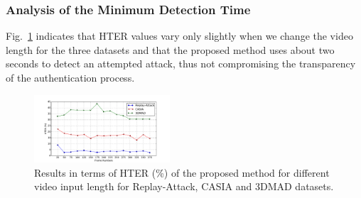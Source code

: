 
\subsubsection{Analysis of the Minimum Detection Time}\label{subsec:n_frames}


Fig.~\ref{fig:n_frames} indicates that HTER values vary only slightly when we change the video length for the three datasets and that the proposed method uses about two seconds to detect an attempted attack, thus not compromising the transparency of the authentication process.
%
\begin{figure}[h]
\centering
\includegraphics[width=0.45\textwidth]{./figures/n_frames}
\caption{Results in terms of HTER (\%) of the proposed method for different video input length for Replay-Attack, CASIA and 3DMAD datasets.}
\label{fig:n_frames}
\end{figure}

